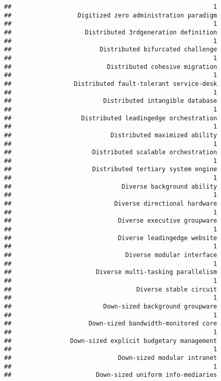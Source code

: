 \documentclass[
]{article}
\begin{document}
\begin{verbatim}
##                                                       1 
##                  Digitized zero administration paradigm 
##                                                       1 
##                    Distributed 3rdgeneration definition 
##                                                       1 
##                        Distributed bifurcated challenge 
##                                                       1 
##                          Distributed cohesive migration 
##                                                       1 
##                 Distributed fault-tolerant service-desk 
##                                                       1 
##                         Distributed intangible database 
##                                                       1 
##                   Distributed leadingedge orchestration 
##                                                       1 
##                           Distributed maximized ability 
##                                                       1 
##                      Distributed scalable orchestration 
##                                                       1 
##                      Distributed tertiary system engine 
##                                                       1 
##                              Diverse background ability 
##                                                       1 
##                            Diverse directional hardware 
##                                                       1 
##                             Diverse executive groupware 
##                                                       1 
##                             Diverse leadingedge website 
##                                                       1 
##                               Diverse modular interface 
##                                                       1 
##                       Diverse multi-tasking parallelism 
##                                                       1 
##                                  Diverse stable circuit 
##                                                       1 
##                         Down-sized background groupware 
##                                                       1 
##                     Down-sized bandwidth-monitored core 
##                                                       1 
##                Down-sized explicit budgetary management 
##                                                       1 
##                             Down-sized modular intranet 
##                                                       1 
##                       Down-sized uniform info-mediaries 

\end{verbatim}
\end{document}
